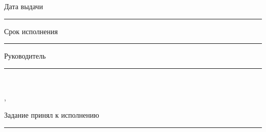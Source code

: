 \vfill

\noindent
Дата выдачи~\rule{4cm}{0.4pt}\hfill Срок исполнения~\rule{4cm}{0.4pt}

\vspace{1.0cm}

\noindent
\begin{minipage}[t]{8.5cm}
    Руководитель~\rule{5cm}{0.4pt}\\
    \hspace*{3.5cm}{\small (подпись)}
\end{minipage}%
\begin{minipage}[t]{\dimexpr\textwidth-8.5cm\relax}
    \vkrSupervisorDegree, \vkrSupervisorPosition\ \vkrSupervisorShort
\end{minipage}

\vspace{0.8cm}

\noindent
Задание принял к исполнению \rule{8cm}{0.4pt}\\
\hspace*{12cm}{\small (подпись)}
\endgroup
